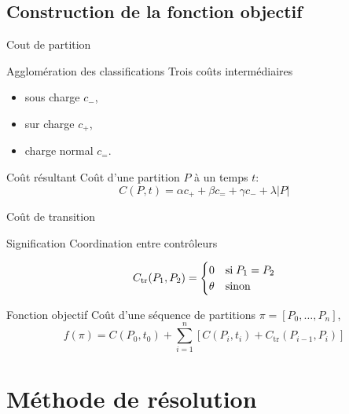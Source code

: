 \documentclass[tikz]{beamer}
\begin{document}
\subsection{Construction de la fonction objectif}
\begin{frame}{Cout de partition}
  \begin{block}{Agglomération des classifications}
    Trois coûts intermédiaires
    \begin{itemize}
      \item sous charge \(c_-\),
      \item sur charge \(c_+\),
      \item charge normal \(c_=\).
    \end{itemize}
  \end{block}
  \begin{block}{Coût résultant}
    Coût d'une partition \(P\) à un temps \(t\):
    \begin{equation}
      C(P,t) = \alpha c_+ + \beta c_= + \gamma c_- + \lambda \vert P \vert
    \end{equation}
  \end{block}
\end{frame}
\begin{frame}[c]{Coût de transition}
  \begin{block}{Signification}
  Coordination entre contrôleurs
  \end{block}
  \begin{equation}
    C_\text{tr}(P_1, P_2) =
    \begin{cases}
      0 & \text{si\;} P_1 = P_2\\
      \theta & \text{sinon}
    \end{cases}
  \end{equation}
\end{frame}
\begin{frame}[c]{Fonction objectif}
  Coût d'une séquence de partitions \(\pi = [P_0, \dots, P_n]\),
  \begin{equation}
    f(\pi) = C(P_0, t_0) + \sum_{i=1}^n \left[
      C(P_i, t_i) + C_\text{tr}(P_{i-1}, P_i)
    \right]
  \end{equation}
\end{frame}

\section{Méthode de résolution}
\end{document}
